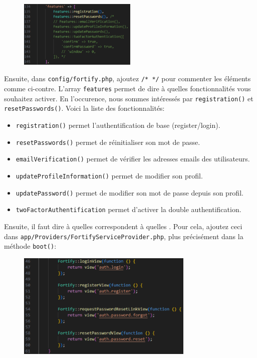 \begin{figure}
    \vspace{-0.5cm}
    \includegraphics[width=0.5\textwidth]{figures-C1/config_fortify.pdf}
\end{figure}

Ensuite, dans \verb|config/fortify.php|, ajoutez \verb|/* */| pour commenter les éléments comme ci-contre. L'array \verb|features| permet de dire à \fortify{} quelles fonctionnalités vous souhaitez activer. En l'occurence, nous sommes intéressés par \verb|registration()| et \verb|resetPasswords()|. Voici la liste des fonctionnalités:

\begin{itemize}
    \item \verb|registration()| permet l'authentification de base (register/login).
    \item \verb|resetPasswords()| permet de réinitialiser son mot de passe.
\end{itemize}

\begin{itemize}[resume, before = \vspace*{-0.63cm}]
    \item \verb|emailVerification()| permet de vérifier les adresses emails des utilisateurs.
    \item \verb|updateProfileInformation()| permet de modifier son profil.
    \item \verb|updatePassword()| permet de modifier son mot de passe depuis son profil. 
    \item \verb|twoFactorAuthentification| permet d'activer la double authentification.
\end{itemize}

Ensuite, il faut dire à \fortify{} quelles \views{} correspondent à quelles \routes{}. Pour cela, ajoutez ceci dans \verb|app/Providers/FortifyServiceProvider.php|, plus précisément dans la méthode \verb|boot()|:

\begin{figure}[!h]
    \centering
    \includegraphics[width=0.75\textwidth]{figures-C1/fortify_provider.pdf}
\end{figure}



